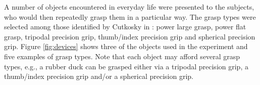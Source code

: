 






A number of objects encountered in everyday life were presented to the
subjects, who would then repeatedly grasp them in a particular way. The
grasp types were selected among those identified by Cutkosky in
\cite{cutkosky}: power large grasp, power flat grasp, tripodal
precision grip, thumb/index precision grip and spherical precision
grip. Figure \ref{fig:devices} shows three of the objects used in the
experiment and five examples of grasp types. Note that each object may
afford several grasp types, e.g., a rubber duck can be grasped either
via a tripodal precision grip, a thumb/index precision grip and/or a
spherical precision grip.


